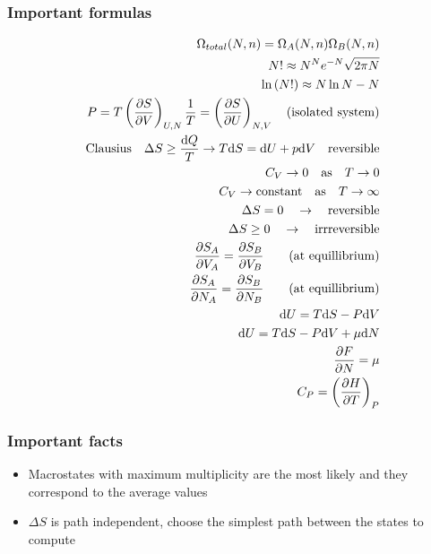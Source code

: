 \documentclass[a4paper, norsk, 8pt]{article}
\begin{document}
\begin{multicols*}{3}
\subsubsection*{\scriptsize Important formulas}
\begin{align*}
  \Omega_{total}(N, n) = \Omega_A(N, n)\Omega_B(N, n)\\
  N! \approx N^Ne^{-N}\sqrt{2\pi N} \\
  \ln{(N!)} \approx N\ln{N}-N \\
  P = T \left( \pdv{S}{V} \right)_{U, N}
  \frac{1}{T} = \left( \pdv{S}{U} \right)_{N, V} \quad (\text{isolated system}) \\
  \text{Clausius} \quad \Delta S \geq \frac{\mbox{d} Q}{T} \rightarrow T\mbox{d} S = \mbox{d}U + p\mbox{d}V \quad \text{reversible}\\
  C_V \rightarrow 0 \quad \text{as} \quad T \rightarrow 0 \\
  C_V \rightarrow \text{constant} \quad \text{as} \quad T \rightarrow \infty \\
  \Delta S = 0 \quad \rightarrow \quad \text{reversible} \\
  \Delta S \geq 0 \quad \rightarrow \quad \text{irrreversible} \\
  \pdv{S_A}{V_A} = \pdv{S_B}{V_B} \qquad (\text{at equillibrium}) \\
  \pdv{S_A}{N_A} = \pdv{S_B}{N_B} \qquad (\text{at equillibrium}) \\
  \mbox{d}U = T\mbox{d}S - P\mbox{d}V \\
  \mbox{d}U = T\mbox{d}S - P\mbox{d}V  + \mu \mbox{d}N\\
  \pdv{F}{N} = \mu \\
  C_P = \left(\pdv{H}{T}\right)_P
\end{align*}

\subsubsection*{\scriptsize Important facts}
\begin{itemize}
  \item Macrostates with maximum multiplicity are the most likely and they correspond to the average values
  \item $\Delta S$ is path independent, choose the simplest path between the states to compute
\end{itemize}


\end{multicols*}
\end{document}

